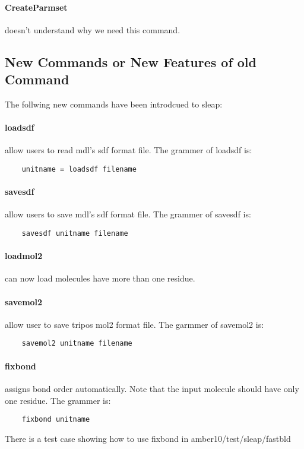 \documentclass[letterpaper]{article}
\begin{document}
\paragraph*{CreateParmset} doesn't understand why we need this command.
   

 
\subsection{New Commands or New Features of old Command}

The follwing new commands have been introdcued to sleap:

\paragraph{loadsdf} allow users to read mdl's sdf format file.
The grammer of loadsdf is:

\begin{lstlisting}
    unitname = loadsdf filename
\end{lstlisting}


\paragraph{savesdf} allow users to save mdl's sdf format file.
The grammer of savesdf is:
\begin{lstlisting}
    savesdf unitname filename
\end{lstlisting}

\paragraph{loadmol2} can now load molecules have more than one residue.

\paragraph{savemol2} allow user to save tripos mol2 format file.
The garmmer of savemol2 is:
\begin{lstlisting}
    savemol2 unitname filename
\end{lstlisting}

\paragraph{fixbond} assigns bond order automatically. Note that the input molecule
should have only one residue. The grammer is:
\begin{lstlisting}
    fixbond unitname
\end{lstlisting}
There is a test case showing how to use fixbond in amber10/test/sleap/fastbld
\end{document}
